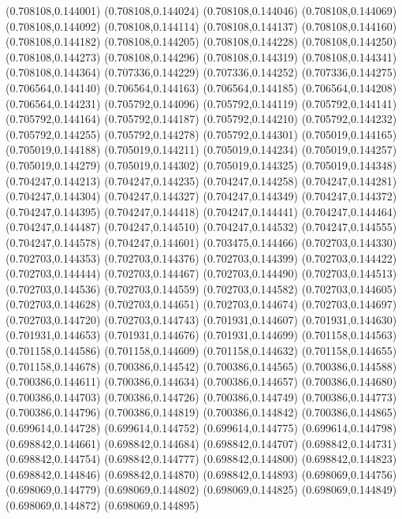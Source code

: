 (0.708108,0.144001)
(0.708108,0.144024)
(0.708108,0.144046)
(0.708108,0.144069)
(0.708108,0.144092)
(0.708108,0.144114)
(0.708108,0.144137)
(0.708108,0.144160)
(0.708108,0.144182)
(0.708108,0.144205)
(0.708108,0.144228)
(0.708108,0.144250)
(0.708108,0.144273)
(0.708108,0.144296)
(0.708108,0.144319)
(0.708108,0.144341)
(0.708108,0.144364)
(0.707336,0.144229)
(0.707336,0.144252)
(0.707336,0.144275)
(0.706564,0.144140)
(0.706564,0.144163)
(0.706564,0.144185)
(0.706564,0.144208)
(0.706564,0.144231)
(0.705792,0.144096)
(0.705792,0.144119)
(0.705792,0.144141)
(0.705792,0.144164)
(0.705792,0.144187)
(0.705792,0.144210)
(0.705792,0.144232)
(0.705792,0.144255)
(0.705792,0.144278)
(0.705792,0.144301)
(0.705019,0.144165)
(0.705019,0.144188)
(0.705019,0.144211)
(0.705019,0.144234)
(0.705019,0.144257)
(0.705019,0.144279)
(0.705019,0.144302)
(0.705019,0.144325)
(0.705019,0.144348)
(0.704247,0.144213)
(0.704247,0.144235)
(0.704247,0.144258)
(0.704247,0.144281)
(0.704247,0.144304)
(0.704247,0.144327)
(0.704247,0.144349)
(0.704247,0.144372)
(0.704247,0.144395)
(0.704247,0.144418)
(0.704247,0.144441)
(0.704247,0.144464)
(0.704247,0.144487)
(0.704247,0.144510)
(0.704247,0.144532)
(0.704247,0.144555)
(0.704247,0.144578)
(0.704247,0.144601)
(0.703475,0.144466)
(0.702703,0.144330)
(0.702703,0.144353)
(0.702703,0.144376)
(0.702703,0.144399)
(0.702703,0.144422)
(0.702703,0.144444)
(0.702703,0.144467)
(0.702703,0.144490)
(0.702703,0.144513)
(0.702703,0.144536)
(0.702703,0.144559)
(0.702703,0.144582)
(0.702703,0.144605)
(0.702703,0.144628)
(0.702703,0.144651)
(0.702703,0.144674)
(0.702703,0.144697)
(0.702703,0.144720)
(0.702703,0.144743)
(0.701931,0.144607)
(0.701931,0.144630)
(0.701931,0.144653)
(0.701931,0.144676)
(0.701931,0.144699)
(0.701158,0.144563)
(0.701158,0.144586)
(0.701158,0.144609)
(0.701158,0.144632)
(0.701158,0.144655)
(0.701158,0.144678)
(0.700386,0.144542)
(0.700386,0.144565)
(0.700386,0.144588)
(0.700386,0.144611)
(0.700386,0.144634)
(0.700386,0.144657)
(0.700386,0.144680)
(0.700386,0.144703)
(0.700386,0.144726)
(0.700386,0.144749)
(0.700386,0.144773)
(0.700386,0.144796)
(0.700386,0.144819)
(0.700386,0.144842)
(0.700386,0.144865)
(0.699614,0.144728)
(0.699614,0.144752)
(0.699614,0.144775)
(0.699614,0.144798)
(0.698842,0.144661)
(0.698842,0.144684)
(0.698842,0.144707)
(0.698842,0.144731)
(0.698842,0.144754)
(0.698842,0.144777)
(0.698842,0.144800)
(0.698842,0.144823)
(0.698842,0.144846)
(0.698842,0.144870)
(0.698842,0.144893)
(0.698069,0.144756)
(0.698069,0.144779)
(0.698069,0.144802)
(0.698069,0.144825)
(0.698069,0.144849)
(0.698069,0.144872)
(0.698069,0.144895)

